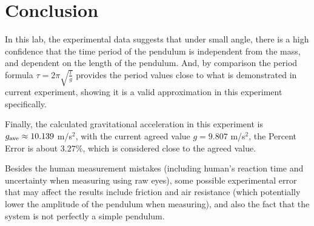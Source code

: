 \documentclass{article}
\begin{document}
\pagebreak

\hfil

\pagebreak

\section{Conclusion}
In this lab, the experimental data suggests that under small angle, there is a high confidence that the time period of the pendulum is independent from the mass, and dependent on the length of the pendulum. And, by comparison the period formula $\tau = 2\pi\sqrt{\frac{l}{g}}$ provides the period values close to what is demonstrated in current experiment, showing it is a valid approximation in this experiment specifically.

Finally, the calculated gravitational acceleration in this experiment is $g_\textmd{ave}\approx 10.139$ m/s$^2$, with the current agreed value $g=9.807$ m/s$^2$, the Percent Error is about $3.27$\%, which is considered close to the agreed value.

\hfil

Besides the human measurement mistakes (including human's reaction time and uncertainty when measuring using raw eyes), some possible experimental error that may affect the results include friction and air resistance (which potentially lower the amplitude of the pendulum when measuring), and also the fact that the system is not perfectly a simple pendulum.
\end{document}
